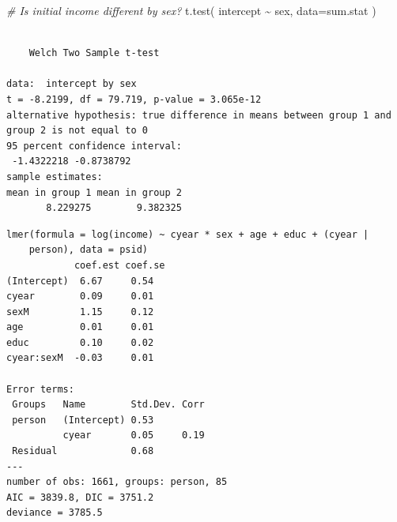 \documentclass[
  letterpaper,
  DIV=11,
  numbers=noendperiod]{scrreprt}
\newenvironment{Shaded}{\begin{snugshade}}{\end{snugshade}}
\newcommand{\AttributeTok}[1]{\textcolor[rgb]{0.49,0.56,0.16}{#1}}
\newcommand{\CommentTok}[1]{\textcolor[rgb]{0.38,0.63,0.69}{\textit{#1}}}
\newcommand{\DecValTok}[1]{\textcolor[rgb]{0.25,0.63,0.44}{#1}}
\newcommand{\FunctionTok}[1]{\textcolor[rgb]{0.02,0.16,0.49}{#1}}
\newcommand{\NormalTok}[1]{\textcolor[rgb]{0.00,0.44,0.13}{#1}}
\newcommand{\OtherTok}[1]{\textcolor[rgb]{0.00,0.44,0.13}{#1}}
\newcommand{\SpecialCharTok}[1]{\textcolor[rgb]{0.25,0.44,0.63}{#1}}
\begin{document}
\begin{Shaded}
\begin{Highlighting}[]
\CommentTok{\# Is initial income different by sex?}
\FunctionTok{t.test}\NormalTok{( intercept }\SpecialCharTok{\textasciitilde{}}\NormalTok{ sex, }\AttributeTok{data=}\NormalTok{sum.stat )}
\end{Highlighting}
\end{Shaded}

\begin{verbatim}

    Welch Two Sample t-test

data:  intercept by sex
t = -8.2199, df = 79.719, p-value = 3.065e-12
alternative hypothesis: true difference in means between group 1 and group 2 is not equal to 0
95 percent confidence interval:
 -1.4322218 -0.8738792
sample estimates:
mean in group 1 mean in group 2 
       8.229275        9.382325 
\end{verbatim}

\begin{Shaded}
\end{Shaded}

\begin{verbatim}
lmer(formula = log(income) ~ cyear * sex + age + educ + (cyear | 
    person), data = psid)
            coef.est coef.se
(Intercept)  6.67     0.54  
cyear        0.09     0.01  
sexM         1.15     0.12  
age          0.01     0.01  
educ         0.10     0.02  
cyear:sexM  -0.03     0.01  

Error terms:
 Groups   Name        Std.Dev. Corr 
 person   (Intercept) 0.53          
          cyear       0.05     0.19 
 Residual             0.68          
---
number of obs: 1661, groups: person, 85
AIC = 3839.8, DIC = 3751.2
deviance = 3785.5 
\end{verbatim}
\end{document}
